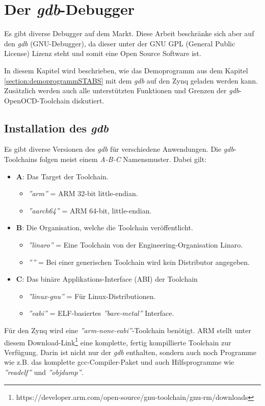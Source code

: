 \chapter{Der \textit{gdb}-Debugger}
Es gibt diverse Debugger auf dem Markt.
Diese Arbeit beschränke sich aber auf den  \textit{gdb} (GNU-Debugger), da dieser unter der GNU GPL (General Public License) Lizenz steht und somit eine Open Source Software ist.

In diesem Kapitel wird beschrieben, wie das Demoprogramm aus dem Kapitel \ref{section:demoprogrammSTABS} mit dem \textit{gdb} auf den Zynq geladen werden kann.
Zusätzlich werden auch alle unterstützten Funktionen und Grenzen der \textit{gdb}-OpenOCD-Toolchain diskutiert.


\section{Installation des \textit{gdb}}
Es gibt diverse Versionen des \textit{gdb} für verschiedene Anwendungen.
Die \textit{gdb}-Toolchains folgen meist einem \textit{A-B-C} Namensmuster.
Dabei gilt:
\begin{itemize}
	\item \textbf{A}: Das Target der Toolchain.
	\begin{itemize}
		\item \textit{''arm''} = ARM 32-bit little-endian.
		\item \textit{''aarch64''} = ARM 64-bit, little-endian.
	\end{itemize}
	\item \textbf{B}: Die Organisation, welche die Toolchain veröffentlicht.
	\begin{itemize}
		\item \textit{''linaro''} = Eine Toolchain von der Engineering-Organisation Linaro.
		\item \textit{''''} = Bei einer generischen Toolchain wird kein Distributor angegeben.
	\end{itemize}
	\item \textbf{C}: Das binäre Applikations-Interface (ABI) der Toolchain
	\begin{itemize}
		\item \textit{''linux-gnu''} = Für Linux-Distributionen.
		\item \textit{''eabi''} = ELF-basiertes \textit{''bare-metal''} Interface.
	\end{itemize}
\end{itemize}

Für den Zynq wird eine \textit{''arm-none-eabi''}-Toolchain benötigt.
ARM stellt unter diesem Download-Link\footnote{https://developer.arm.com/open-source/gnu-toolchain/gnu-rm/downloads} eine komplette, fertig kompillierte Toolchain zur Verfügung.
Darin ist nicht nur der \textit{gdb} enthalten, sondern auch noch Programme wie z.B. das komplette gcc-Compiler-Paket und auch Hilfsprogramme wie \textit{''readelf''} und \textit{''objdump''}.

